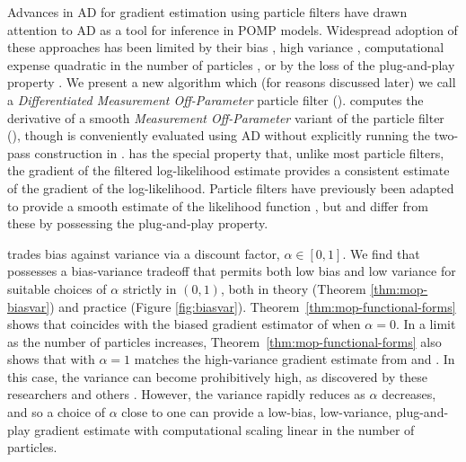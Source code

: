 Advances in AD for gradient estimation using particle filters \citep{naesseth18, jonschkowski18, corenflos21, scibior21, singh22} have drawn attention to AD as a tool for inference in POMP models.
Widespread adoption of these approaches has been limited by their bias \citep{naesseth18, jonschkowski18}, high variance \citep{poyiadjis11, scibior21}, computational expense quadratic in the number of particles \citep{corenflos21, chen24}, or by the loss of the plug-and-play property \citep{poyiadjis11, scibior21, singh22, chen24}.
We present a new algorithm which (for reasons discussed later) we call a {\it Differentiated Measurement Off-Parameter} particle filter ().
 computes the derivative of a smooth {\it Measurement Off-Parameter} variant of the particle filter (), though  is conveniently evaluated using AD without explicitly running the two-pass construction in .
 has the special property that, unlike most particle filters, the gradient of the filtered log-likelihood estimate provides a consistent estimate of the gradient of the log-likelihood.
Particle filters have previously been adapted to provide a smooth estimate of the likelihood function \citep{svensson18,malik11}, but  and  differ from these by possessing the plug-and-play property.

 trades bias against variance via a discount factor, $\alpha \in [0,1]$.
We find that  possesses a bias-variance tradeoff that permits both low bias and low variance for suitable choices of $\alpha$ strictly in $(0,1)$, both in theory (Theorem \ref{thm:mop-biasvar}) and practice (Figure \ref{fig:biasvar}).
Theorem~\ref{thm:mop-functional-forms} shows that  coincides with the biased gradient estimator of \cite{naesseth18} when $\alpha=0$.
In a limit as the number of particles increases, Theorem~\ref{thm:mop-functional-forms} also shows that  with $\alpha=1$ matches the high-variance gradient estimate from \cite{poyiadjis11} and \cite{scibior21}.
In this case, the variance can become prohibitively high, as discovered by these researchers and others \citep{arya22}.
However, the variance rapidly reduces as $\alpha$ decreases, and so a choice of $\alpha$ close to one can provide a low-bias, low-variance, plug-and-play gradient estimate with computational scaling linear in the number of particles.

